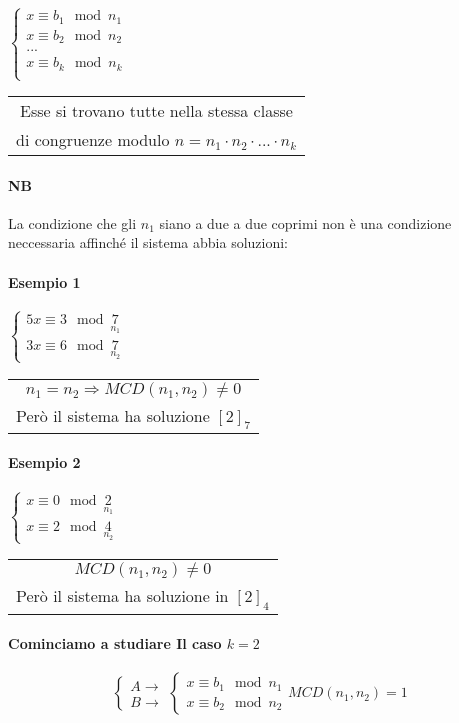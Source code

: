 $
\begin{cases}
    x\equiv b_1\mod n_1\\
    x\equiv b_2\mod n_2\\
    ...\\
    x\equiv b_k\mod n_k\\
\end{cases}
$
\begin{tabular}{c}
Esse si trovano tutte nella stessa classe\\ di congruenze modulo
$n=n_1\cdot n_2\cdot...\cdot n_k$
\end{tabular}
\paragraph{NB} La condizione che gli $n_1$ siano a due a due coprimi
non è una condizione neccessaria affinché il sistema abbia soluzioni:
\paragraph{Esempio 1}
$
\begin{cases}
    5x\equiv 3\mod \underset{n_1}{7}\\
    3x\equiv 6\mod \underset{n_2}{7}
\end{cases}
$
\begin{tabular}{c}
 $n_1=n_2\Longrightarrow MCD(n_1,n_2)\neq 0$ \\Però il sistema ha soluzione $[2]_7$
\end{tabular}
\paragraph{Esempio 2}
$
\begin{cases}
    x\equiv 0\mod \underset{n_1}{2}\\
    x\equiv 2\mod \underset{n_2}{4}
\end{cases}
$
\begin{tabular}{c}
    $MCD(n_1,n_2)\neq 0$\\
Però il sistema ha soluzione in $[2]_4$
\end{tabular}
\paragraph{Cominciamo a studiare Il caso $k=2$} 
$$
\begin{cases}
    A\rightarrow\\
    B\rightarrow
\end{cases}
\begin{cases}
    x\equiv b_1\mod n_1\\
    x\equiv b_2\mod n_ 2
\end{cases}
MCD(n_1,n_2)=1
$$
